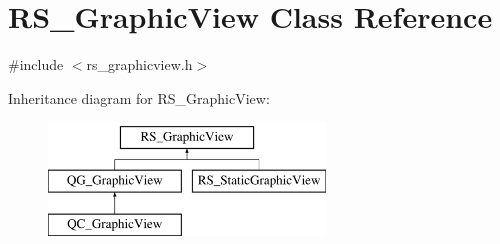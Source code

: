 \hypertarget{classRS__GraphicView}{\section{R\-S\-\_\-\-Graphic\-View Class Reference}
\label{classRS__GraphicView}
}


{\ttfamily \#include $<$rs\-\_\-graphicview.\-h$>$}

Inheritance diagram for R\-S\-\_\-\-Graphic\-View\-:\begin{figure}[H]
\begin{center}
\leavevmode
\includegraphics[height=3.000000cm]{classRS__GraphicView}
\end{center}
\end{figure}
